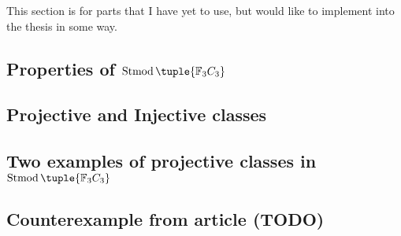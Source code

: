 
This section is for parts that I have yet to use, but would like to implement into the thesis in some way.

\subsection{Properties of \texorpdfstring{\( \Stmod\tuple{ \Fb_3 C_3 } \)}{Stmod(F\_3C\_3)}} 


\subsection{Projective and Injective classes}


\subsection{Two examples of projective classes in \texorpdfstring{\( \Stmod\tuple{ \Fb_3 C_3 } \)}{Stmod(F\_3C\_3)}}


\subsection{Counterexample from article (TODO)}

